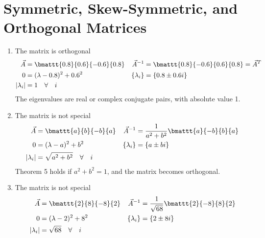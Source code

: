 \section{Symmetric, Skew-Symmetric, and Orthogonal Matrices}

\begin{enumerate}
    \item The matrix is orthogonal
          \begin{align}
              \vec{A}       & = \bmattt{0.8}{0.6}{-0.6}{0.8}             &
              \vec{A}^{-1}  & = \bmattt{0.8}{-0.6}{0.6}{0.8} = \vec{A}^T   \\
              0             & = (\lambda - 0.8)^2 + 0.6^2                &
              \{\lambda_i\} & = \{0.8 \pm 0.6i\}                           \\
              |\lambda_i|   & = 1 \quad \forall \quad i
          \end{align}
          The eigenvalues are real or complex conjugate pairs, with absolute value 1.

    \item The matrix is not special
          \begin{align}
              \vec{A}       & = \bmattt{a}{b}{-b}{a}                   &
              \vec{A}^{-1}  & = \frac{1}{a^2 + b^2}
              \bmattt{a}{-b}{b}{a}                                       \\
              0             & = (\lambda - a)^2 + b^2                  &
              \{\lambda_i\} & = \{a \pm bi\}                             \\
              |\lambda_i|   & = \sqrt{a^2 + b^2} \quad \forall \quad i
          \end{align}
          Theorem 5 holds if $ a^2 + b^2 = 1 $, and the matrix becomes orthogonal.

    \item The matrix is not special
          \begin{align}
              \vec{A}       & = \bmattt{2}{8}{-8}{2}            &
              \vec{A}^{-1}  & = \frac{1}{\sqrt{68}}
              \bmattt{2}{-8}{8}{2}                                \\
              0             & = (\lambda - 2)^2 + 8^2           &
              \{\lambda_i\} & = \{2 \pm 8i\}                      \\
              |\lambda_i|   & = \sqrt{68} \quad \forall \quad i
          \end{align}


\end{enumerate}
